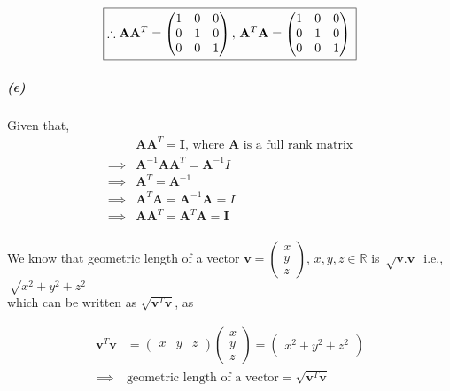 \documentclass[12pt, letterpaper]{article}
\begin{document}
\[\boxed{
\therefore
\mathbf{A}\mathbf{A}^T =
\begin{pmatrix}
1 &0 &0\\
0 &1 &0\\
0 &0 &1
\end{pmatrix},\,
\mathbf{A}^T\mathbf{A} =
\begin{pmatrix}
1 &0 &0\\
0 &1 &0\\
0 &0 &1
\end{pmatrix}\\
}\]

\subparagraph{(e)} Given that,
\begin{equation}\label{5e}\begin{split}
&\mathbf{AA}^T = \mathbf{I}\text{, where }\mathbf{A}\text{ is a full rank matrix}\\
\implies &\mathbf{A}^{-1}\mathbf{AA}^T = \mathbf{A}^{-1}I\\
\implies &\mathbf{A}^T = \mathbf{A}^{-1}\\
\implies &\mathbf{A}^T\mathbf{A} = \mathbf{A}^{-1}\mathbf{A} = I\\
\implies &\boxed{\mathbf{AA}^T = \mathbf{A}^T\mathbf{A} = \mathbf{I}}
\end{split}\end{equation}\\

We know that geometric length of a vector $\mathbf{v} = \begin{pmatrix} x\\y\\z \end{pmatrix},\,x,y,z\in\mathbb{R}$ is
$\,\sqrt{\mathbf{v}.\mathbf{v}}\,$ i.e., $\,\sqrt{x^2 + y^2 + z^2}$\\
which can be written as $\sqrt{\mathbf{v}^T\mathbf{v}}$, as

\begin{equation}\label{5e1}\begin{split}
\mathbf{v}^T\mathbf{v} &= \begin{pmatrix}x&y&z\end{pmatrix}\begin{pmatrix}x\\y\\z\end{pmatrix}
    = \begin{pmatrix}x^2 + y^2 + z^2\end{pmatrix}\\
\implies &\boxed{\text{geometric length of a vector} = \sqrt{\mathbf{v}^T\mathbf{v}}}
\end{split}\end{equation}
\end{document}
